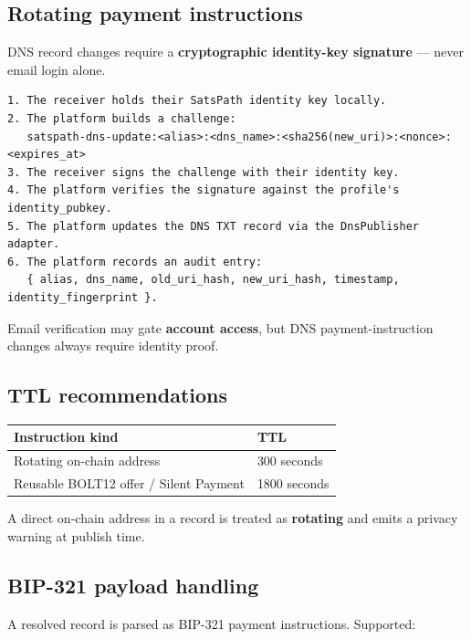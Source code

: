 \documentclass[
]{article}
\begin{document}
\hypertarget{rotating-payment-instructions}{%
\subsection{Rotating payment
instructions}\label{rotating-payment-instructions}}

DNS record changes require a \textbf{cryptographic identity-key
signature} --- never email login alone.

\begin{verbatim}
1. The receiver holds their SatsPath identity key locally.
2. The platform builds a challenge:
   satspath-dns-update:<alias>:<dns_name>:<sha256(new_uri)>:<nonce>:<expires_at>
3. The receiver signs the challenge with their identity key.
4. The platform verifies the signature against the profile's identity_pubkey.
5. The platform updates the DNS TXT record via the DnsPublisher adapter.
6. The platform records an audit entry:
   { alias, dns_name, old_uri_hash, new_uri_hash, timestamp, identity_fingerprint }.
\end{verbatim}

Email verification may gate \textbf{account access}, but DNS
payment-instruction changes always require identity proof.

\hypertarget{ttl-recommendations}{%
\subsection{TTL recommendations}\label{ttl-recommendations}}

\begin{longtable}[]{@{}ll@{}}
\toprule\noalign{}
Instruction kind & TTL \\
\midrule\noalign{}
\endhead
\bottomrule\noalign{}
\endlastfoot
Rotating on-chain address & 300 seconds \\
Reusable BOLT12 offer / Silent Payment & 1800 seconds \\
\end{longtable}

A direct on-chain address in a record is treated as \textbf{rotating}
and emits a privacy warning at publish time.

\hypertarget{bip-321-payload-handling}{%
\subsection{BIP-321 payload handling}\label{bip-321-payload-handling}}

A resolved record is parsed as BIP-321 payment instructions. Supported:
\end{document}
